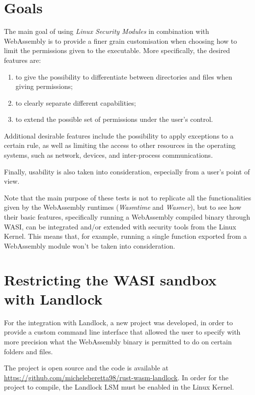\section{Goals}

The main goal of using \textit{Linux Security Modules} in combination with WebAssembly
is to provide a finer grain customisation when choosing how to limit the permissions given
to the executable. More specifically, the desired features are:
\begin{enumerate}
  \item to give the possibility to differentiate between directories and files when giving permissions;
  \item to clearly separate different capabilities;
  \item to extend the possible set of permissions under the user's control.
\end{enumerate}

Additional desirable features include the possibility to apply exceptions to a certain rule, as well
as limiting the access to other resources in the operating systems, such as network, devices, and
inter-process communications.

Finally, usability is also taken into consideration, especially from a user's point of view.

Note that the main purpose of these tests is not to replicate all the functionalities given by
the WebAssembly runtimes (\textit{Wasmtime} and \textit{Wasmer}), but to see how their basic features,
specifically running a WebAssembly compiled binary through WASI, can be integrated and/or extended with
security tools from the Linux Kernel.
This means that, for example, running a single function exported from a WebAssembly module won't be taken
into consideration.

\section{Restricting the WASI sandbox with Landlock}
\label{sec:restricting-wasi-landlock}

For the integration with Landlock, a new project was developed, in order to provide
a custom command line interface that allowed the user to specify with more precision what
the WebAssembly binary is permitted to do on certain folders and files.

The project is open source and the code is available at \url{https://github.com/micheleberetta98/rust-wasm-landlock}.
In order for the project to compile, the Landlock LSM must be enabled in the Linux Kernel.

